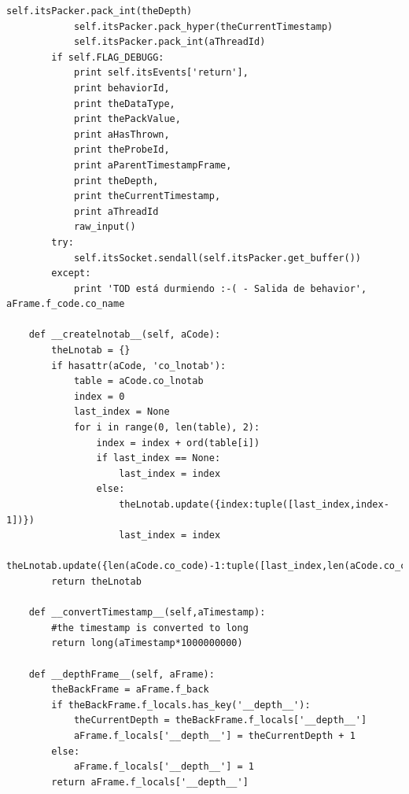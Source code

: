 \documentclass[12pt,legalpaper]{report}
\begin{document}
\begin{singlespace}
\begin{lstlisting}[style=Python]
            self.itsPacker.pack_int(theDepth)
            self.itsPacker.pack_hyper(theCurrentTimestamp)
            self.itsPacker.pack_int(aThreadId)
        if self.FLAG_DEBUGG:
            print self.itsEvents['return'],
            print behaviorId,
            print theDataType,
            print thePackValue,
            print aHasThrown,
            print theProbeId,
            print aParentTimestampFrame,
            print theDepth,
            print theCurrentTimestamp,
            print aThreadId
            raw_input()
        try:
            self.itsSocket.sendall(self.itsPacker.get_buffer())
        except:
            print 'TOD está durmiendo :-( - Salida de behavior', aFrame.f_code.co_name
        
    def __createlnotab__(self, aCode):
        theLnotab = {}
        if hasattr(aCode, 'co_lnotab'):
            table = aCode.co_lnotab
            index = 0
            last_index = None
            for i in range(0, len(table), 2):
                index = index + ord(table[i])
                if last_index == None:
                    last_index = index
                else:
                    theLnotab.update({index:tuple([last_index,index-1])})                
                    last_index = index
            theLnotab.update({len(aCode.co_code)-1:tuple([last_index,len(aCode.co_code)-1])})                
        return theLnotab        

    def __convertTimestamp__(self,aTimestamp):
        #the timestamp is converted to long
        return long(aTimestamp*1000000000)

    def __depthFrame__(self, aFrame):
        theBackFrame = aFrame.f_back
        if theBackFrame.f_locals.has_key('__depth__'):
            theCurrentDepth = theBackFrame.f_locals['__depth__']
            aFrame.f_locals['__depth__'] = theCurrentDepth + 1
        else:
            aFrame.f_locals['__depth__'] = 1
        return aFrame.f_locals['__depth__']
    

\end{lstlisting}
\end{singlespace}
\end{document}
